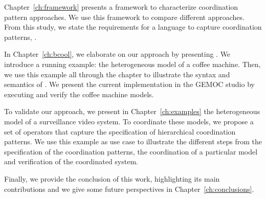 Chapter~\ref{ch:framework} presents a framework to characterize coordination pattern approaches. We use this framework to compare different approaches. From this study, we state the requirements for a language to capture coordination patterns, \ie \bcool.  

In Chapter~\ref{ch:bcool}, we elaborate on our approach by presenting \bcool. We introduce a running example: the heterogeneous model of a coffee machine. Then, we use this example all through the chapter to illustrate the syntax and semantics of \bcool. We present the current implementation in the GEMOC studio by executing and verify the coffee machine models. 

To validate our approach, we present in Chapter~\ref{ch:examples} the heterogeneous model of a surveillance video system. To coordinate these models, we propose a set of \bcool operators that capture the specification of hierarchical coordination patterns. We use this example as use case to illustrate the different steps from the specification of the coordination patterns, the coordination of a particular model and verification of the coordinated system.     

Finally, we provide the conclusion of this work, highlighting its main contributions and we give some future perspectives in Chapter~\ref{ch:conclusions}.

	
	



